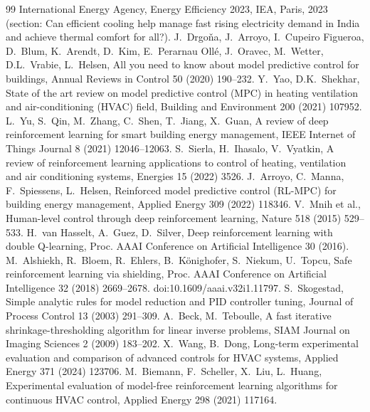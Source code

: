 \begin{thebibliography}{99}\small
{} International Energy Agency, Energy Efficiency 2023, IEA, Paris, 2023 (section: Can efficient cooling help manage fast rising electricity demand in India and achieve thermal comfort for all?).
 J.~Drgo\v{n}a, J.~Arroyo, I.~Cupeiro Figueroa, D.~Blum, K.~Arendt, D.~Kim, E.~Perarnau Oll\'e, J.~Oravec, M.~Wetter, D.L.~Vrabie, L.~Helsen, All you need to know about model predictive control for buildings, Annual Reviews in Control 50 (2020) 190--232.
 Y.~Yao, D.K.~Shekhar, State of the art review on model predictive control (MPC) in heating ventilation and air-conditioning (HVAC) field, Building and Environment 200 (2021) 107952.
 L.~Yu, S.~Qin, M.~Zhang, C.~Shen, T.~Jiang, X.~Guan, A review of deep reinforcement learning for smart building energy management, IEEE Internet of Things Journal 8 (2021) 12046--12063.
 S.~Sierla, H.~Ihasalo, V.~Vyatkin, A review of reinforcement learning applications to control of heating, ventilation and air conditioning systems, Energies 15 (2022) 3526.
 J.~Arroyo, C.~Manna, F.~Spiessens, L.~Helsen, Reinforced model predictive control (RL-MPC) for building energy management, Applied Energy 309 (2022) 118346.
 V.~Mnih et al., Human-level control through deep reinforcement learning, Nature 518 (2015) 529--533.
 H.~van Hasselt, A.~Guez, D.~Silver, Deep reinforcement learning with double Q-learning, Proc. AAAI Conference on Artificial Intelligence 30 (2016).
 M.~Alshiekh, R.~Bloem, R.~Ehlers, B.~K\"onighofer, S.~Niekum, U.~Topcu, Safe reinforcement learning via shielding, Proc. AAAI Conference on Artificial Intelligence 32 (2018) 2669--2678. doi:10.1609/aaai.v32i1.11797.
 S.~Skogestad, Simple analytic rules for model reduction and PID controller tuning, Journal of Process Control 13 (2003) 291--309.
 A.~Beck, M.~Teboulle, A fast iterative shrinkage-thresholding algorithm for linear inverse problems, SIAM Journal on Imaging Sciences 2 (2009) 183--202.
 X.~Wang, B.~Dong, Long-term experimental evaluation and comparison of advanced controls for HVAC systems, Applied Energy 371 (2024) 123706.
 M.~Biemann, F.~Scheller, X.~Liu, L.~Huang, Experimental evaluation of model-free reinforcement learning algorithms for continuous HVAC control, Applied Energy 298 (2021) 117164.

\end{thebibliography}
